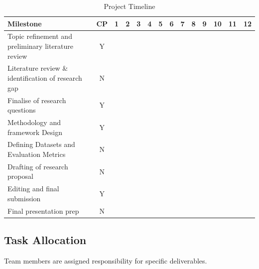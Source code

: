 \begin{table}[H]
\centering
\small
\begin{tabular}{|p{6cm}|c|c c c c c c c c c c c c|}
\hline
\textbf{Milestone} & \textbf{CP} & \textbf{1} & \textbf{2} & \textbf{3} & \textbf{4} & \textbf{5} & \textbf{6} & \textbf{7} & \textbf{8} & \textbf{9} & \textbf{10} & \textbf{11} & \textbf{12} \\
\hline

Topic refinement and preliminary literature review & Y & \cellcolor{green!80!red!50} &  &  &  &  &  &  &  &  &  &  &  \\
\hline

Literature review \& identification of research gap & N &  & \cellcolor{green!80!red!50} & \cellcolor{green!80!red!50} &  &  &  &  &  &  &  &  &  \\
\hline

Finalise of research questions & Y &  &  &  & \cellcolor{green!80!red!50} &  &  &  &  &  &  &  &  \\
\hline

Methodology and framework Design & Y &  &  &  &  & \cellcolor{green!80!red!50} & \cellcolor{green!80!red!50} &  &  &  &  &  &  \\
\hline

Defining Datasets and Evaluation Metrics & N &  &  &  &  &  & \cellcolor{green!80!red!50} & \cellcolor{green!80!red!50} &  &  &  &  &  \\
\hline

Drafting of research proposal & N &  &  &  &  & \cellcolor{green!80!red!50} & \cellcolor{green!80!red!50} & \cellcolor{green!80!red!50} & \cellcolor{green!80!red!50} & \cellcolor{green!80!red!50} & \cellcolor{green!80!red!50} &  &  \\
\hline

Editing and final submission & Y &  &  &  &  &  & \cellcolor{green!80!red!50} &  &  & \cellcolor{green!80!red!50} & \cellcolor{green!80!red!50} &  &  \\
\hline

Final presentation prep & N &  &  &  &  &  &  &  &  &  &  & \cellcolor{green!80!red!50} & \cellcolor{green!80!red!50} \\
\hline

\end{tabular}
\caption{Project Timeline}
\end{table}

\subsection{Task Allocation}
Team members are assigned responsibility for specific deliverables.

